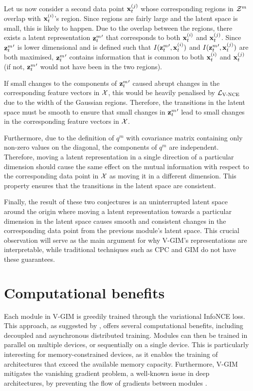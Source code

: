 			Let us now consider a second data point $\mathbf{x}_t^{(j)}$ whose corresponding regions in $\mathcal{Z}^m$ overlap with $\mathbf{x}_t^{(i)}$'s region. Since regions are fairly large and the latent space is small, this is likely to happen. Due to the overlap between the regions, there exists a latent representation ${\mathbf{z}_t^{m}}'$ that corresponds to both $\mathbf{x}_t^{(i)}$ and $\mathbf{x}_t^{(j)}$. 
			Since ${\mathbf{z}_t^{m}}'$ is lower dimensional and is defined such that $I({\mathbf{z}_t^{m}}', \mathbf{x}_t^{(i)})$ and $I({\mathbf{z}_t^{m}}', \mathbf{x}_t^{(j)})$ are both maximised, ${\mathbf{z}_t^{m}}'$ contains information that is common to both $\mathbf{x}_t^{(i)}$ and $\mathbf{x}_t^{(j)}$ (if not, ${\mathbf{z}_t^{m}}'$ would not have been in the two regions).
			
			If small changes to the components of ${\mathbf{z}_t^{m}}'$ caused abrupt changes in the corresponding feature vectors in $\mathcal{X}$, this would be heavily penalised by $\mathcal{L}_{\text{V-NCE}}$ due to the width of the Gaussian regions. Therefore, the transitions in the latent space must be smooth to ensure that small changes in ${\mathbf{z}_t^{m}}'$ lead to small changes in the corresponding feature vectors in $\mathcal{X}$.
			
			Furthermore, due to the definition of $q^m$ with covariance matrix containing only non-zero values on the diagonal, the components of $q^m$ are independent. Therefore, moving a latent representation in a single direction of a particular dimension should cause the same effect on the mutual information with respect to the corresponding data point in $\mathcal{X}$ as moving it in a different dimension. This property ensures that the transitions in the latent space are consistent.
							
			Finally, the result of these two conjectures is an uninterrupted latent space around the origin 
			where moving a latent representation towards a particular dimension in the latent space causes smooth and consistent changes in the corresponding data point from the previous module's latent space. This crucial observation will serve as the main argument for why V-GIM's representations are interpretable, while traditional techniques such as CPC and GIM do not have these guarantees. 
		
		
			


		
\section{Computational benefits} \label{cha:vgim_benefits}
	Each module in V-GIM is greedily trained through the variational InfoNCE loss. This approach, as suggested by \cite{lowePuttingEndEndtoEnd2020a}, offers several computational benefits, including decoupled and asynchronous distributed training. Modules can then be trained in parallel on multiple devices, or sequentially on a single device. This is particularly interesting for memory-constrained devices, 
	as it enables the training of architectures that exceed the available memory capacity. Furthermore, V-GIM mitigates the vanishing gradient problem, a well-known issue in deep architectures, by preventing the flow of gradients between modules \citep{huHandlingVanishingGradient2021}.
	
